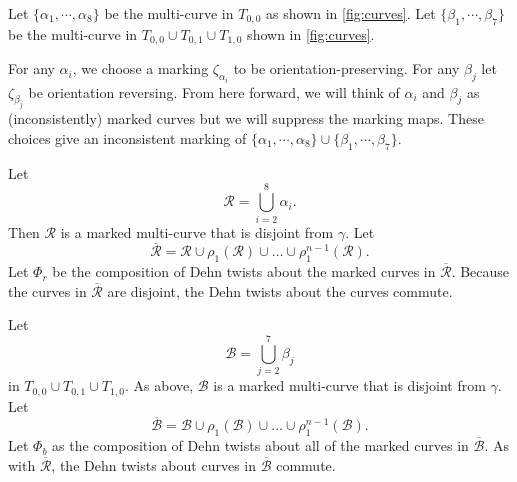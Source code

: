 
Let $\{\alpha_1,\cdots,\alpha_8\}$ be the multi-curve in $T_{0,0}$ as shown in \autoref{fig:curves}.  Let $\{\beta_1,\cdots,\beta_7\}$ be the multi-curve in $T_{0,0}\cup T_{0,1}\cup T_{1,0}$ shown in \autoref{fig:curves}. %

For any $\alpha_i$, we choose a marking $\zeta_{\alpha_i}$ to be orientation-preserving.  For any $\beta_j$ let $\zeta_{\beta_j}$ be
orientation reversing. From here forward, we will think of $\alpha_i$ and $\beta_j$ as (inconsistently) marked curves but we will suppress the marking maps. These choices give an inconsistent marking of $\{\alpha_1,\cdots,\alpha_8\}\cup\{\beta_1,\cdots,\beta_7\}$.

Let 
$$\mathcal{R}=\displaystyle\bigcup_{i=2}^8\alpha_i.$$ Then $\mathcal{R}$ is a marked multi-curve that is disjoint from $\gamma$.  Let
$$\overline{\mathcal{R}}= \mathcal{R} \cup \rho_1(\mathcal{R}) \cup \dots \cup
\rho_1^{n-1}(\mathcal{R}).$$
Let $\Phi_r$ be the composition of Dehn twists about the marked curves in $\overline{\mathcal{R}}$.  Because the curves in $\overline{\mathcal{R}}$ are disjoint, the Dehn twists about the curves commute.

Let $$\mathcal{B}=\displaystyle\bigcup_{j=2}^7\beta_j$$ in $T_{0,0} \cup T_{0,1} \cup T_{1,0}$. As above, $\mathcal{B}$ is a marked multi-curve that is disjoint from $\gamma$.  Let $$\overline{\mathcal{B}} = \mathcal{B} \cup \rho_1(\mathcal{B}) \cup \dots \cup
\rho_1^{n-1}(\mathcal{B}).$$
Let $\Phi_b$
as the composition of Dehn twists about all of the marked curves in $\overline{\mathcal{B}}$.
As with $\overline{\mathcal{R}}$, the Dehn twists about curves in $\overline{\mathcal{B}}$ 
commute.




